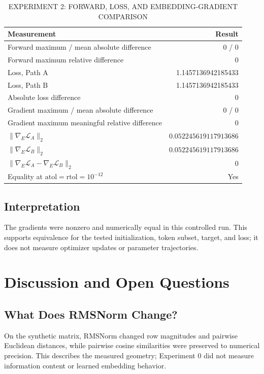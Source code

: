 \documentclass[conference]{IEEEtran}
\begin{document}
\begin{table}[t]
\caption{EXPERIMENT 2: FORWARD, LOSS, AND EMBEDDING-GRADIENT COMPARISON}
\label{tab:exp2}
\centering
\scriptsize
\setlength{\tabcolsep}{2.5pt}
\begin{tabular}{p{}r}
\toprule
Measurement & Result\\
\midrule
Forward maximum / mean absolute difference & 0 / 0\\
Forward maximum relative difference & 0\\
Loss, Path A & 1.1457136942185433\\
Loss, Path B & 1.1457136942185433\\
Absolute loss difference & 0\\
Gradient maximum / mean absolute difference & 0 / 0\\
Gradient maximum meaningful relative difference & 0\\
\(\|\nabla_E\mathcal{L}_A\|_2\) & \(0.052245619117913686\)\\
\(\|\nabla_E\mathcal{L}_B\|_2\) & \(0.052245619117913686\)\\
\(\|\nabla_E\mathcal{L}_A-\nabla_E\mathcal{L}_B\|_2\) & 0\\
Equality at \(\mathrm{atol}=\mathrm{rtol}=10^{-12}\) & Yes\\
\bottomrule
\end{tabular}
\end{table}

\subsection{Interpretation}
The gradients were nonzero and numerically equal in this controlled run. This supports equivalence for the tested initialization, token subset, target, and loss; it does not measure optimizer updates or parameter trajectories.

\section{Discussion and Open Questions}
\subsection{What Does RMSNorm Change?}
On the synthetic matrix, RMSNorm changed row magnitudes and pairwise Euclidean distances, while pairwise cosine similarities were preserved to numerical precision. This describes the measured geometry; Experiment 0 did not measure information content or learned embedding behavior.
\end{document}

